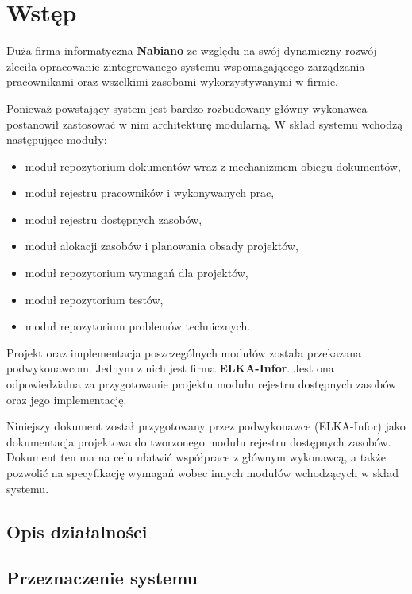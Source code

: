 \section{Wstęp}

Duża firma informatyczna {\bf Nabiano} ze względu na swój dynamiczny
rozwój zleciła opracowanie zintegrowanego systemu wspomagającego
zarządzania pracownikami oraz wszelkimi zasobami wykorzystywanymi w
firmie.

Ponieważ powstający system jest bardzo rozbudowany główny wykonawca
postanowił zastosować w nim architekturę modularną. W skład systemu
wchodzą następujące moduły:

\begin{itemize}
\item moduł repozytorium dokumentów wraz z mechanizmem obiegu dokumentów,
\item moduł rejestru pracowników i wykonywanych prac,
\item moduł rejestru dostępnych zasobów,
\item moduł alokacji zasobów i planowania obsady projektów,
\item moduł repozytorium wymagań dla projektów,
\item moduł repozytorium testów,
\item moduł repozytorium problemów technicznych.
\end{itemize}

Projekt oraz implementacja poszczególnych modułów została przekazana
podwykonawcom. Jednym z nich jest firma {\bf ELKA-Infor}. Jest ona
odpowiedzialna za przygotowanie projektu modułu rejestru dostępnych
zasobów oraz jego implementację.

Niniejszy dokument został przygotowany przez podwykonawce (ELKA-Infor)
jako dokumentacja projektowa do tworzonego modułu rejestru dostępnych
zasobów. Dokument ten ma na celu ułatwić współprace z głównym
wykonawcą, a także pozwolić na specyfikację wymagań wobec innych
modułów wchodzących w skład systemu.

\subsection{Opis działalności}
\subsection{Przeznaczenie systemu}

